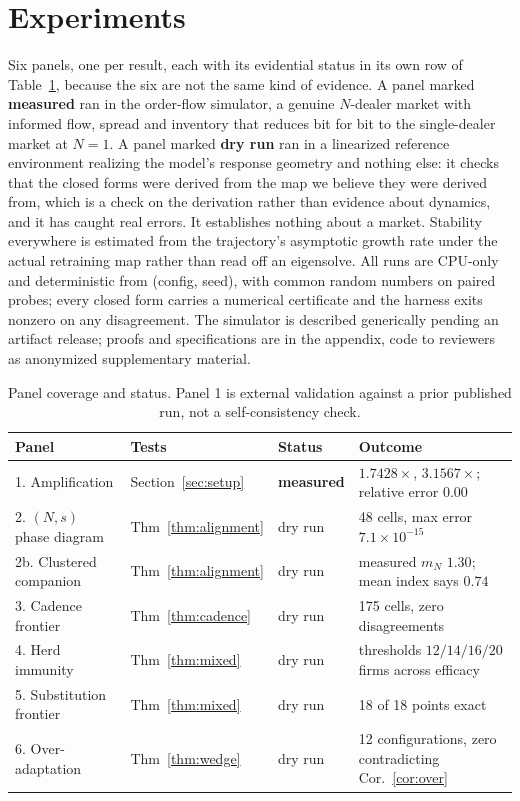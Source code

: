 \documentclass{article}
\theoremstyle{plain}
\theoremstyle{definition}
\newcommand{\mN}{m_N}
\begin{document}
\section{Experiments}
\label{sec:experiments}

Six panels, one per result, each with its evidential status in its own row of Table~\ref{tab:panels}, because the six are not the same kind of evidence. A panel marked \textbf{measured} ran in the order-flow simulator, a genuine $N$-dealer market with informed flow, spread and inventory that reduces bit for bit to the single-dealer market at $N=1$. A panel marked \textbf{dry run} ran in a linearized reference environment realizing the model's response geometry and nothing else: it checks that the closed forms were derived from the map we believe they were derived from, which is a check on the derivation rather than evidence about dynamics, and it has caught real errors. It establishes nothing about a market. Stability everywhere is estimated from the trajectory's asymptotic growth rate under the actual retraining map rather than read off an eigensolve. All runs are CPU-only and deterministic from (config, seed), with common random numbers on paired probes; every closed form carries a numerical certificate and the harness exits nonzero on any disagreement. The simulator is described generically pending an artifact release; proofs and specifications are in the appendix, code to reviewers as anonymized supplementary material.

\begin{table}[t]
\centering
\caption{Panel coverage and status. Panel 1 is external validation against a prior published run, not a self-consistency check.}
\label{tab:panels}
\small
\begin{tabular}{llll}
\toprule
Panel & Tests & Status & Outcome \\
\midrule
1. Amplification & Section~\ref{sec:setup} & \textbf{measured} & $1.7428\times$, $3.1567\times$; relative error $0.00$ \\
2. $(N,s)$ phase diagram & Thm~\ref{thm:alignment} & dry run & 48 cells, max error $7.1\times 10^{-15}$ \\
2b. Clustered companion & Thm~\ref{thm:alignment} & dry run & measured $\mN$ $1.30$; mean index says $0.74$ \\
3. Cadence frontier & Thm~\ref{thm:cadence} & dry run & 175 cells, zero disagreements \\
4. Herd immunity & Thm~\ref{thm:mixed} & dry run & thresholds $12/14/16/20$ firms across efficacy \\
5. Substitution frontier & Thm~\ref{thm:mixed} & dry run & 18 of 18 points exact \\
6. Over-adaptation & Thm~\ref{thm:wedge} & dry run & 12 configurations, zero contradicting Cor.~\ref{cor:over} \\
\bottomrule
\end{tabular}
\end{table}
\end{document}
